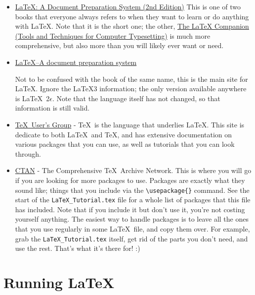 \documentclass[letterpaper]{article}
\begin{document}
\begin{itemize}

\item 
\href{http://www.amazon.com/LaTeX-Document-Preparation-System-2nd/dp/0201529831}
{\underline{LaTeX: A Document Preparation System (2nd Edition)}} This 
is one of two books that everyone always refers to when they want to 
learn or do anything with \LaTeX.  Note that it is the short one; the other, 
\href{http://www.amazon.com/LaTeX-Companion-Techniques-Computer-Typesetting/dp/0201362996}
{\underline{The LaTeX Companion (Tools and Techniques for Computer Typesetting)}} 
is much more comprehensive, but also more than you will likely ever 
want or need.

\item \href{http://www.latex-project.org/}{LaTeX--A document preparation system} 

Not to be confused with the book of the same name, 
this is the main site for \LaTeX.  Ignore the LaTeX3 information; the 
only version available anywhere is \LaTeX\ 2$\epsilon$.  Note that the 
language itself has not changed, so that information is still valid.

\item \href{http://www.tug.org/}{\TeX\ User's Group} - \TeX\ is the 
language that underlies \LaTeX.  This site is dedicate to both \LaTeX\ 
and \TeX, and has extensive documentation on various packages that you 
can use, as well as tutorials that you can look through.

\item \href{http://www.tug.org/ctan.html}{CTAN} - The Comprehensive 
\TeX\ Archive Network.  This is where you will go if you are looking for 
more packages to use.  Packages are exactly what they sound like; things 
that you include via the \verb+\usepackage{}+ command.  See the start of 
the \verb+LaTeX_Tutorial.tex+ file for a whole list of packages that 
this file has included.  Note that if you include it but don't use it, 
you're not costing yourself anything.  The easiest way to handle 
packages is to leave all the ones that you use regularly in some \LaTeX\ 
file, and copy them over.  For example, grab the 
\verb+LaTeX_Tutorial.tex+ itself, get rid of the parts you don't need, 
and use the rest.  That's what it's there for! :)

\end{itemize}

\section{Running \LaTeX}
\end{document}
